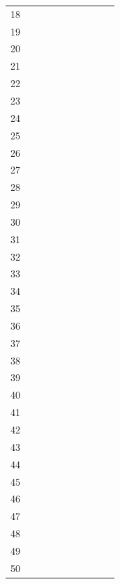 \documentclass[11pt,a4paper,oneside]{article}
\newcommand{\chk}{\fbox{\rule{0pt}{0.95ex}\rule{0.95ex}{0pt}}}
\begin{document}
{\begin{longtable}{@{}r >{\raggedright\arraybackslash}p{0.11\linewidth} >{\raggedright\arraybackslash}p{0.13\linewidth} >{\raggedright\arraybackslash}p{0.07\linewidth} c c c c c c@{}}
  18 & & & & & \chk & \chk & \chk & \chk & \chk \\
  19 & & & & & \chk & \chk & \chk & \chk & \chk \\
  20 & & & & & \chk & \chk & \chk & \chk & \chk \\
  21 & & & & & \chk & \chk & \chk & \chk & \chk \\
  22 & & & & & \chk & \chk & \chk & \chk & \chk \\
  23 & & & & & \chk & \chk & \chk & \chk & \chk \\
  24 & & & & & \chk & \chk & \chk & \chk & \chk \\
  25 & & & & & \chk & \chk & \chk & \chk & \chk \\
  26 & & & & & \chk & \chk & \chk & \chk & \chk \\
  27 & & & & & \chk & \chk & \chk & \chk & \chk \\
  28 & & & & & \chk & \chk & \chk & \chk & \chk \\
  29 & & & & & \chk & \chk & \chk & \chk & \chk \\
  30 & & & & & \chk & \chk & \chk & \chk & \chk \\
  31 & & & & & \chk & \chk & \chk & \chk & \chk \\
  32 & & & & & \chk & \chk & \chk & \chk & \chk \\
  33 & & & & & \chk & \chk & \chk & \chk & \chk \\
  34 & & & & & \chk & \chk & \chk & \chk & \chk \\
  35 & & & & & \chk & \chk & \chk & \chk & \chk \\
  36 & & & & & \chk & \chk & \chk & \chk & \chk \\
  37 & & & & & \chk & \chk & \chk & \chk & \chk \\
  38 & & & & & \chk & \chk & \chk & \chk & \chk \\
  39 & & & & & \chk & \chk & \chk & \chk & \chk \\
  40 & & & & & \chk & \chk & \chk & \chk & \chk \\
  41 & & & & & \chk & \chk & \chk & \chk & \chk \\
  42 & & & & & \chk & \chk & \chk & \chk & \chk \\
  43 & & & & & \chk & \chk & \chk & \chk & \chk \\
  44 & & & & & \chk & \chk & \chk & \chk & \chk \\
  45 & & & & & \chk & \chk & \chk & \chk & \chk \\
  46 & & & & & \chk & \chk & \chk & \chk & \chk \\
  47 & & & & & \chk & \chk & \chk & \chk & \chk \\
  48 & & & & & \chk & \chk & \chk & \chk & \chk \\
  49 & & & & & \chk & \chk & \chk & \chk & \chk \\
  50 & & & & & \chk & \chk & \chk & \chk & \chk \\
\end{longtable}
}
\end{document}
